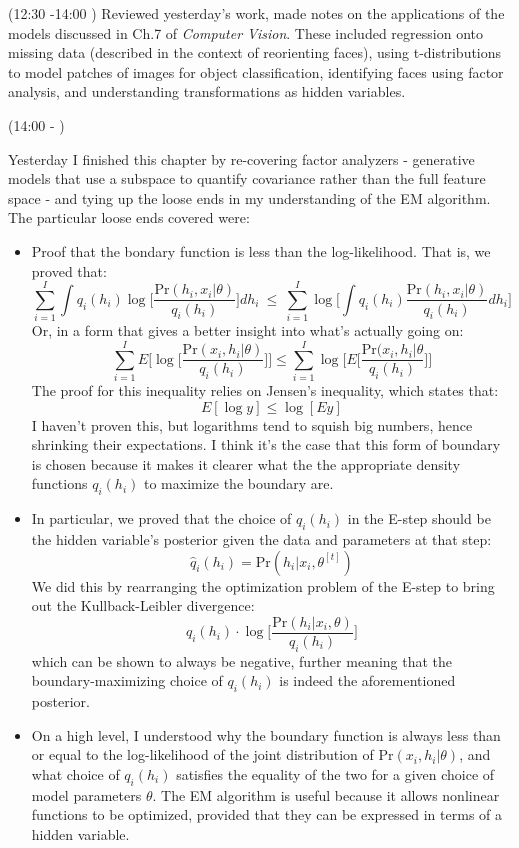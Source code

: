 \documentclass[idxtotoc,hyperref,openany]{labbook} %
\begin{document}
(12:30 -14:00 ) Reviewed yesterday's work, made notes on the applications of the models discussed in Ch.7 of \emph{Computer Vision}. These included regression onto missing data (described in the context of reorienting faces), using t-distributions to model patches of images for object classification, identifying faces using factor analysis, and understanding transformations as hidden variables.

(14:00 - )

 Yesterday I finished this chapter by re-covering factor analyzers - generative models that use a subspace to quantify covariance rather than the full feature space - and tying up the loose ends in my understanding of the EM algorithm. The particular loose ends covered were:
 \begin{itemize}
 	\item Proof that the bondary function is less than the log-likelihood. That is, we proved that:
 	\[
 		\sum_{i=1}^I \int q_i(h_i) \log\Bigg[\frac{\text{Pr}(h_i, x_i| \theta)}{q_i(h_i)} \Bigg]dh_i \ \leq \ \sum_{i=1}^I \log\Bigg[\int q_i(h_i) \frac{\text{Pr}(h_i, x_i| \theta)}{q_i(h_i)}dh_i \Bigg]
 	\]
 	Or, in a form that gives a better insight into what's actually going on:
 	\[
 		\sum_{i=1}^I E\Bigg[\log\Big[\frac{\text{Pr}(x_i, h_i|\theta)}{q_i(h_i)}\Big]\Bigg] \leq \sum_{i=1}^I \log\Bigg[E\Big[\frac{\text{Pr}(x_i, h_i|\theta}{q_i (h_i)}\Big]\Bigg]
 	\]
 	The proof for this inequality relies on Jensen's inequality, which states that:
 	\[
 		E[\log y] \leq \log[Ey]
 	\]
 	I haven't proven this, but logarithms tend to squish big numbers, hence shrinking their expectations. I think it's the case that this form of boundary is chosen because it makes it clearer what the the appropriate density functions $q_i(h_i)$ to maximize the boundary are.
 	\item In particular, we proved that the choice of $q_i(h_i)$ in the E-step should be the hidden variable's posterior given the data and parameters at that step:
 	\[
 		\hat{q}_i(h_i) = \text{Pr}(h_i | x_i, \theta^{[t]})
 	\]
 	We did this by rearranging the optimization problem of the E-step to bring out the Kullback-Leibler divergence:
 	\[
 		q_i(h_i) \cdot \log\Big[\frac{\text{Pr}(h_i|x_i, \theta)}{q_i(h_i)}\Big]
 	\]
 	which can be shown to always be negative, further meaning that the boundary-maximizing choice of $q_i(h_i)$ is indeed the aforementioned posterior.
 	\item On a high level, I understood why the boundary function is always less than or equal to the log-likelihood of the joint distribution of $\text{Pr}(x_i, h_i|\theta)$, and what choice of $q_i(h_i)$ satisfies the equality of the two for a given choice of model parameters $\theta$. The EM algorithm is useful because it allows nonlinear functions to be optimized, provided that they can be expressed in terms of a hidden variable.
 \end{itemize}
\end{document}
